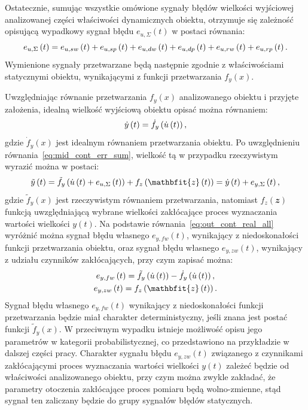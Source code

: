 Ostatecznie, sumując wszystkie omówione sygnały błędów wielkości wyjściowej analizowanej części właściwości dynamicznych obiektu, otrzymuje się zależność opisującą wypadkowy sygnał błędu $e_{u,\Sigma}(t)$ w postaci równania:
\begin{equation}
e_{u,\Sigma} \left(t\right) = e_{u,sw} \left(t\right) + e_{u,sp} \left(t\right) + e_{u,dw} \left(t\right) + e_{u,dp} \left(t\right) + e_{u,rw} \left(t\right) + e_{u,rp} \left(t\right) \label{eq:mid_cont_err_sum}.
\end{equation}
Wymienione sygnały przetwarzane będą następnie zgodnie z właściwościami statycznymi obiektu, wynikającymi z funkcji przetwarzania $f_{y}(x)$.

Uwzględniając równanie przetwarzania $f_{y}(x)$ analizowanego obiektu i przyjęte założenia, idealną wielkość wyjściową obiektu opisać można równaniem:
\begin{equation}
\dot{y} \left(t\right) = \dot{f}_{y} \left( \dot{u} \left(t\right) \right) \label{eq:out_cont_ideal_all},
\end{equation}
gdzie $\dot{f}_{y}(x)$ jest idealnym równaniem przetwarzania obiektu. Po uwzględnieniu równania~\eqref{eq:mid_cont_err_sum}, wielkość tą w przypadku rzeczywistym wyrazić można w postaci:
\begin{equation}
\tilde{y} \emb{t} = \tilde{f}_{y} \left( \dot{u} \emb{t} + e_{u,\Sigma} \emb{t} \right) + f_{z} \emb{\mathbfit{z} \emb{t}} = \dot{y} \emb{t} + e_{y,\Sigma} \emb{t} \label{eq:out_cont_real_all},
\end{equation}
gdzie $\tilde{f}_{y}(x)$ jest rzeczywistym równaniem przetwarzania, natomiast $f_{z}(\mathbfit{z})$ funkcją uwzględniającą wybrane wielkości zakłócające proces wyznaczania wartości wielkości $y(t)$. Na podstawie równania~\eqref{eq:out_cont_real_all} wyróżnić można sygnał błędu własnego $e_{y,fw}(t)$, wynikający z niedoskonałości funkcji przetwarzania obiektu, oraz sygnał błędu własnego $e_{y,zw}(t)$, wynikający z udziału czynników zakłócających, przy czym zapisać można:
\begin{gather}
e_{y,fw} \emb{t} = \tilde{f}_{y} \left( \dot{u} \emb{t} \right) - \dot{f}_{y} \left( \dot{u} \emb{t} \right) \label{eq:out_cont_err_funct_self}, \\
e_{y,zw} \emb{t} = f_{z} \emb{\mathbfit{z} \emb{t}} \label{eq:out_cont_err_env_self}.
\end{gather}
Sygnał błędu własnego $e_{y,fw}(t)$ wynikający z niedoskonałości funkcji przetwarzania będzie miał charakter deterministyczny, jeśli znana jest postać funkcji $\tilde{f}_{y}(x)$. W przeciwnym wypadku istnieje możliwość opisu jego parametrów w kategorii probabilistycznej, co przedstawiono na przykładzie w dalszej części pracy. Charakter sygnału błędu $e_{y,zw}(t)$ związanego z czynnikami zakłócającymi proces wyznaczania wartości wielkości $y(t)$ zależeć będzie od właściwości analizowanego obiektu, przy czym można zwykle zakładać, że parametry otoczenia zakłócające proces pomiaru będą wolno-zmienne, stąd sygnał ten zaliczany będzie do grupy sygnałów błędów statycznych.

